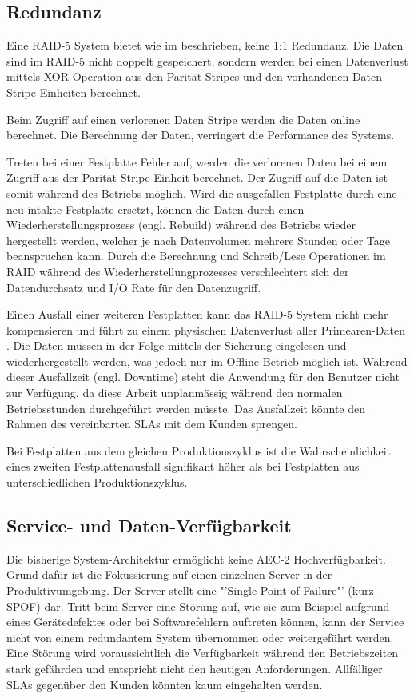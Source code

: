 \subsection{Redundanz}
Eine RAID-5 System bietet wie im  beschrieben, keine 1:1 Redundanz. Die Daten sind im RAID-5 nicht doppelt gespeichert, sondern werden bei einen Datenverlust mittels XOR Operation aus den Parität Stripes und den vorhandenen Daten Stripe-Einheiten berechnet. 

Beim Zugriff auf einen verlorenen Daten Stripe werden die Daten online berechnet. Die Berechnung der Daten, verringert die Performance des Systems.

Treten bei einer Festplatte Fehler auf, werden die verlorenen Daten bei einem Zugriff aus der Parität Stripe Einheit berechnet. Der Zugriff auf die Daten ist somit während des Betriebs möglich. Wird die ausgefallen Festplatte durch eine neu intakte Festplatte ersetzt, können die Daten durch einen Wiederherstellungsprozess (engl. Rebuild) während des Betriebs wieder hergestellt werden, welcher je nach Datenvolumen mehrere Stunden oder Tage beanspruchen kann. Durch die Berechnung und Schreib/Lese Operationen im RAID während des Wiederherstellungprozesses verschlechtert sich der Datendurchsatz und I/O Rate für den Datenzugriff.

Einen Ausfall einer weiteren Festplatten kann das RAID-5 System nicht mehr kompensieren und führt zu einem physischen Datenverlust aller \gls{Primearen-Daten} . Die Daten müssen in der Folge mittels der Sicherung eingelesen und wiederhergestellt werden, was jedoch nur im Offline-Betrieb möglich ist. Während dieser Ausfallzeit (engl. Downtime) steht die Anwendung für den Benutzer nicht zur Verfügung, da diese Arbeit unplanmässig während den normalen Betriebsstunden durchgeführt werden müsste. Das Ausfallzeit könnte den Rahmen des vereinbarten SLAs mit dem Kunden sprengen. 

Bei Festplatten aus dem gleichen Produktionszyklus ist die Wahrscheinlichkeit eines zweiten Festplattenausfall signifikant höher als bei Festplatten aus unterschiedlichen Produktionszyklus.

\subsection{Service- und Daten-Verfügbarkeit}
Die bisherige System-Architektur ermöglicht keine AEC-2 Hochverfügbarkeit. Grund dafür ist die Fokussierung auf einen einzelnen Server in der Produktivumgebung. Der Server stellt eine "'Single Point of Failure"' (kurz SPOF) dar. Tritt beim Server eine Störung auf, wie sie zum Beispiel aufgrund eines Gerätedefektes oder bei Softwarefehlern auftreten können, kann der Service nicht von einem redundantem System übernommen oder weitergeführt werden. Eine Störung wird voraussichtlich die Verfügbarkeit während den Betriebszeiten stark gefährden und entspricht nicht den heutigen Anforderungen. Allfälliger SLAs gegenüber den Kunden könnten kaum eingehalten werden.

